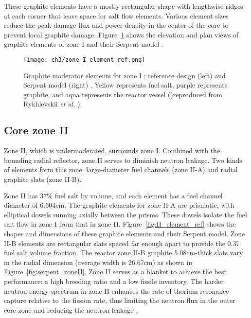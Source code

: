 These graphite elements have a mostly rectangular shape with lengthwise ridges 
at each corner that leave space for salt flow elements. Various element sizes 
reduce the peak damage flux and power density in the center of the core to 
prevent local graphite damage. Figure~\ref{fig:I_element_ref} shows the 
elevation and plan views of graphite elements of zone I 
\cite{robertson_conceptual_1971} and their Serpent model 
\cite{rykhlevskii_full-core_2017}.
\begin{figure}[ht!] %
	\texttt{[image: ch3/zone\_I\_element\_ref.png]}
	\caption{Graphite moderator elements for zone I : reference design (left)
		\cite{robertson_conceptual_1971} and Serpent model (right) 
		\cite{rykhlevskii_full-core_2017}.  Yellow 
		represents fuel salt, purple represents graphite, and aqua represents 
		the reactor vessel ()reproduced from Rykhlevskii \emph{et al.} 
		\cite{rykhlevskii_modeling_2019}).}
	\label{fig:I_element_ref}
\end{figure}

\subsection{Core zone II}
Zone II, which is undermoderated, surrounds zone I. Combined with the bounding 
radial reflector, zone II serves to diminish neutron leakage. Two kinds of 
elements form this zone: large-diameter fuel channels (zone II-A) and 
radial graphite slats (zone II-B). 

Zone II has 37\% fuel salt by volume, and each element has a fuel channel 
diameter of 6.604cm. The graphite elements for zone II-A are prismatic, with
elliptical dowels running axially between the prisms. These dowels
isolate the fuel salt flow in zone I from that in zone II.  
Figure~\ref{fig:II_element_ref} shows the shapes and dimensions of these 
graphite elements and their Serpent model. Zone II-B elements are rectangular 
slats spaced far enough apart to provide the 0.37 fuel salt volume fraction. 
The reactor zone II-B graphite 5.08cm-thick slats vary in the radial dimension 
(average width is 26.67cm) as shown in Figure~\ref{fig:serpent_zoneII}. Zone 
II serves as a blanket to achieve the best performance: a high breeding ratio 
and a low fissile inventory. The harder neutron energy spectrum in zone II 
enhances the rate of thorium resonance capture relative to the fission rate, 
thus limiting the neutron flux in the outer core zone and reducing the neutron 
leakage \cite{robertson_conceptual_1971}. 

